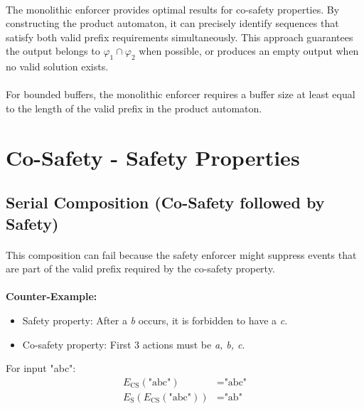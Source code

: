 \paragraph{}
The monolithic enforcer provides optimal results for co-safety properties. By constructing the product automaton, it can precisely identify sequences that satisfy both valid prefix requirements simultaneously. This approach guarantees the output belongs to $\varphi_1 \cap \varphi_2$ when possible, or produces an empty output when no valid solution exists.

\paragraph{}
For bounded buffers, the monolithic enforcer requires a buffer size at least equal to the length of the valid prefix in the product automaton.

\section{Co-Safety - Safety Properties}

\subsection{Serial Composition (Co-Safety followed by Safety)}
\paragraph{}
This composition can fail because the safety enforcer might suppress events that are part of the valid prefix required by the co-safety property.

\paragraph{}
\textbf{Counter-Example:}
\begin{itemize}
    \item Safety property: After a \textit{b} occurs, it is forbidden to have a \textit{c}.
    \item Co-safety property: First 3 actions must be \textit{a, b, c}.
\end{itemize}

For input "abc":
\begin{align*}
    E_{\text{CS}}(\text{"abc"}) &= \text{"abc"} \\
    E_{\text{S}}(E_{\text{CS}}(\text{"abc"})) &= \text{"ab"}
\end{align*}

